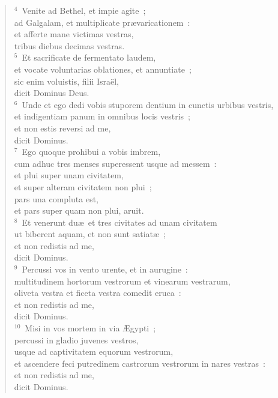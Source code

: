 \begin{verse}${}^{4}$~Venite ad Bethel, et impie agite~;\\ ad Galgalam, et multiplicate pr\ae varicationem~:\\ et afferte mane victimas vestras,\\ tribus diebus decimas vestras.\\
${}^{5}$~Et sacrificate de fermentato laudem,\\ et vocate voluntarias oblationes, et annuntiate~;\\ sic enim voluistis, filii Isra\"el,\\ dicit Dominus Deus.\\
${}^{6}$~Unde et ego dedi vobis stuporem dentium in cunctis urbibus vestris,\\ et indigentiam panum in omnibus locis vestris~;\\ et non estis reversi ad me,\\ dicit Dominus.\\
${}^{7}$~Ego quoque prohibui a vobis imbrem,\\ cum adhuc tres menses superessent usque ad messem~:\\ et plui super unam civitatem,\\ et super alteram civitatem non plui~;\\ pars una compluta est,\\ et pars super quam non plui, aruit.\\
${}^{8}$~Et venerunt du\ae\ et tres civitates ad unam civitatem\\ ut biberent aquam, et non sunt satiat\ae~;\\ et non redistis ad me,\\ dicit Dominus.\\
${}^{9}$~Percussi vos in vento urente, et in aurugine~:\\ multitudinem hortorum vestrorum et vinearum vestrarum,\\ oliveta vestra et ficeta vestra comedit eruca~:\\ et non redistis ad me,\\ dicit Dominus.\\
${}^{10}$~Misi in vos mortem in via \AE gypti~;\\ percussi in gladio juvenes vestros,\\ usque ad captivitatem equorum vestrorum,\\ et ascendere feci putredinem castrorum vestrorum in nares vestras~:\\ et non redistis ad me,\\ dicit Dominus.\\

\end{verse}

